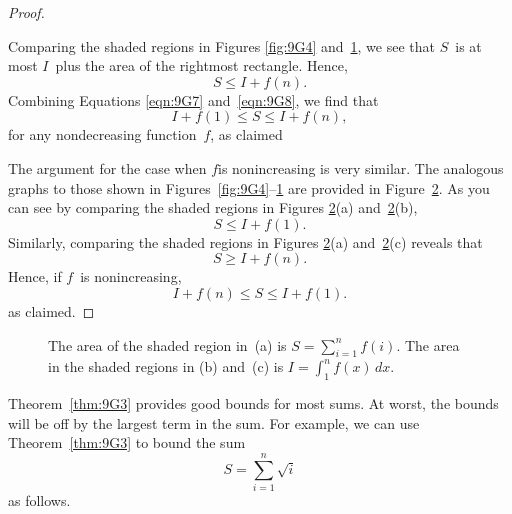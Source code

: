 \begin{proof}
\begin{figure}
\label{fig:9G6}

\end{figure}

Comparing the shaded regions in Figures \ref{fig:9G4}
and~\ref{fig:9G6}, we see that $S$~is at most $I$~plus the area of the
rightmost rectangle.  Hence,
\begin{equation}\label{eqn:9G8}
    S \le I + f(n).
\end{equation}
Combining Equations \ref{eqn:9G7} and~\ref{eqn:9G8}, we find that
\begin{equation*}
    I + f(1) \le S \le I + f(n),
\end{equation*}
for any nondecreasing function~$f$, as claimed

The argument for the case when $f$is nonincreasing is very similar.
The analogous graphs to those shown in
Figures~\ref{fig:9G4}--\ref{fig:9G6} are provided in
Figure~\ref{fig:9G9}.  As you can see by comparing the shaded regions
in Figures \ref{fig:9G9}(a) and~\ref{fig:9G9}(b),
\begin{equation*}
    S \le I + f(1).
\end{equation*}
Similarly, comparing the shaded regions in Figures \ref{fig:9G9}(a)
and~\ref{fig:9G9}(c) reveals that
\begin{equation*}
    S \ge I + f(n).
\end{equation*}
Hence, if $f$~is nonincreasing,
\begin{equation*}
    I + f(n) \le S \le I + f(1).
\end{equation*}
as claimed.
\end{proof}

\begin{figure}




\caption{The area of the shaded region in~(a) is $S = \sum_{i = 1}^n
  f(i)$.  The area in the shaded regions in (b) and~(c) is $I =
  \int_1^n f(x)\,dx$.}

\label{fig:9G9}

\end{figure}

Theorem~\ref{thm:9G3} provides good bounds for most sums.  At worst,
the bounds will be off by the largest term in the sum.  For example,
we can use Theorem~\ref{thm:9G3} to bound the sum
\begin{equation*}
    S = \sum_{i = 1}^n \sqrt{i}
\end{equation*}
as follows.

